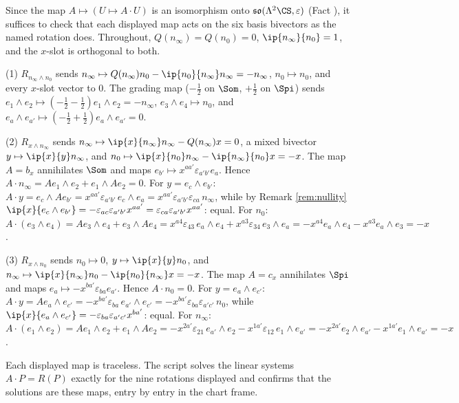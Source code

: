 Since the map $A \mapsto (U \mapsto A\cdot U)$ is an isomorphism onto $\mathfrak{so}(\Lambda^{2}\CS,\varepsilon)$ (Fact ), it suffices to check that each displayed map acts on the six basis bivectors as the named rotation does. Throughout, $Q(n_{\infty}) = Q(n_{0}) = 0$, $\ip{n_{\infty}}{n_{0}} = 1$, and the $x$-slot is orthogonal to both.

(1) $R_{n_{\infty}\wedge n_{0}}$ sends $n_{\infty} \mapsto Q(n_{\infty})n_{0} - \ip{n_{0}}{n_{\infty}}n_{\infty} = -n_{\infty}$, $n_{0} \mapsto n_{0}$, and every $x$-slot vector to $0$. The grading map ($-\tfrac12$ on $\Som$, $+\tfrac12$ on $\Spi$) sends $e_{1}\wedge e_{2} \mapsto (-\tfrac12 - \tfrac12)e_{1}\wedge e_{2} = -n_{\infty}$, $e_{3}\wedge e_{4} \mapsto n_{0}$, and $e_{a}\wedge e_{a'} \mapsto (-\tfrac12 + \tfrac12)e_{a}\wedge e_{a'} = 0$.

(2) $R_{x\wedge n_{\infty}}$ sends $n_{\infty} \mapsto \ip{x}{n_{\infty}}n_{\infty} - Q(n_{\infty})x = 0$, a mixed bivector $y \mapsto \ip{x}{y}n_{\infty}$, and $n_{0} \mapsto \ip{x}{n_{0}}n_{\infty} - \ip{n_{\infty}}{n_{0}}x = -x$. The map $A = b_{x}$ annihilates $\Som$ and maps $e_{b'} \mapsto x^{aa'}\varepsilon_{a'b'}e_{a}$. Hence $A\cdot n_{\infty} = Ae_{1}\wedge e_{2} + e_{1}\wedge Ae_{2} = 0$. For $y = e_{c}\wedge e_{b'}$: $A\cdot y = e_{c}\wedge Ae_{b'} = x^{aa'}\varepsilon_{a'b'}\,e_{c}\wedge e_{a} = x^{aa'}\varepsilon_{a'b'}\varepsilon_{ca}\,n_{\infty}$, while by Remark \ref{rem:nullity} $\ip{x}{e_{c}\wedge e_{b'}} = -\varepsilon_{ac}\varepsilon_{a'b'}x^{aa'} = \varepsilon_{ca}\varepsilon_{a'b'}x^{aa'}$: equal. For $n_{0}$: $A\cdot(e_{3}\wedge e_{4}) = Ae_{3}\wedge e_{4} + e_{3}\wedge Ae_{4} = x^{a4}\varepsilon_{43}\,e_{a}\wedge e_{4} + x^{a3}\varepsilon_{34}\,e_{3}\wedge e_{a} = -x^{a4}e_{a}\wedge e_{4} - x^{a3}e_{a}\wedge e_{3} = -x$.

(3) $R_{x\wedge n_{0}}$ sends $n_{0} \mapsto 0$, $y \mapsto \ip{x}{y}n_{0}$, and $n_{\infty} \mapsto \ip{x}{n_{\infty}}n_{0} - \ip{n_{0}}{n_{\infty}}x = -x$. The map $A = c_{x}$ annihilates $\Spi$ and maps $e_{a} \mapsto -x^{ba'}\varepsilon_{ba}e_{a'}$. Hence $A\cdot n_{0} = 0$. For $y = e_{a}\wedge e_{c'}$: $A\cdot y = Ae_{a}\wedge e_{c'} = -x^{ba'}\varepsilon_{ba}\,e_{a'}\wedge e_{c'} = -x^{ba'}\varepsilon_{ba}\varepsilon_{a'c'}\,n_{0}$, while $\ip{x}{e_{a}\wedge e_{c'}} = -\varepsilon_{ba}\varepsilon_{a'c'}x^{ba'}$: equal. For $n_{\infty}$: $A\cdot(e_{1}\wedge e_{2}) = Ae_{1}\wedge e_{2} + e_{1}\wedge Ae_{2} = -x^{2a'}\varepsilon_{21}\,e_{a'}\wedge e_{2} - x^{1a'}\varepsilon_{12}\,e_{1}\wedge e_{a'} = -x^{2a'}e_{2}\wedge e_{a'} - x^{1a'}e_{1}\wedge e_{a'} = -x$.

Each displayed map is traceless. The script solves the linear systems $A\cdot P = R(P)$ exactly for the nine rotations displayed and confirms that the solutions are these maps, entry by entry in the chart frame.
